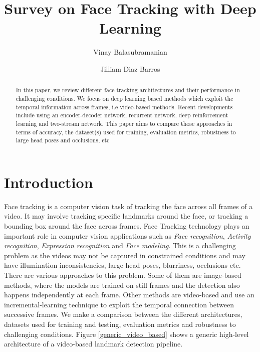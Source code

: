 \documentclass{llncs}
\begin{document}
\pagestyle{headings}  %

%
\title{Survey on Face Tracking with Deep Learning}
%
%
\author{Vinay Balasubramanian \and Jilliam Diaz Barros}
%
%

\maketitle              %

\begin{abstract}
In this paper, we review different face tracking architectures and their performance in challenging conditions. We focus on deep learning  based methods which exploit the temporal information across frames, i.e video-based methods. Recent developments include using an encoder-decoder network, recurrent network, deep reinforcement learning and two-stream network. This paper aims to compare those approaches in terms of accuracy, the dataset(s) used for training, evaluation metrics, robustness to large head poses and occlusions, etc
\end{abstract}


\section{Introduction}
Face tracking is a computer vision task of tracking the face across all frames of a video. It may involve tracking specific landmarks around the face, or tracking a bounding box around the face across frames.
Face Tracking technology plays an important role in computer vision applications such as \textit{Face recognition}\cite{face_recognition}, \textit{Activity recognition}, \textit{Expression recognition}\cite{expression_recognition} and \textit{Face modeling}. This is a challenging problem as the videos may not be captured in constrained conditions and may have illumination inconsistencies, large head poses, blurriness, occlusions etc.\\

There are various approaches to this problem. Some of them are image-based methods, where the models are trained on still frames and the detection also happens independently at each frame. Other methods are video-based and use an incremental-learning technique to exploit the temporal connection between successive frames. We make a comparison between the different architectures, datasets used for training and testing, evaluation metrics and robustness to challenging conditions. Figure \textcolor{red}{\ref{generic_video_based}} shows a generic high-level architecture of a video-based landmark detection pipeline.
\end{document}
